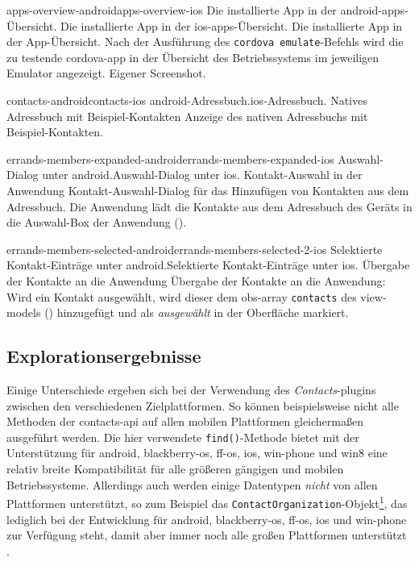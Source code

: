 	
	{apps-overview-android}{apps-overview-ios}
	{Die installierte App in der \gls{android}-\glspl{app}-Übersicht.}
	{Die installierte App in der \gls{ios}-\glspl{app}-Übersicht.}
	{Die installierte App in der App-Übersicht.}
	{Nach der Ausführung des \lstinline|cordova emulate|-Befehls wird die zu testende \gls{cordova}-\gls{app} in der Übersicht des Betriebssystems im jeweiligen Emulator angezeigt.}
	{Eigener Screenshot.}
	
	{contacts-android}{contacts-ios}
	{\gls{android}-Adressbuch.}{\gls{ios}-Adressbuch.}
	{Natives Adressbuch mit Beispiel-Kontakten}
	{Anzeige des nativen Adressbuchs mit Beispiel-Kontakten.}
	{\ownScreenshot}
	
	{errands-members-expanded-android}{errands-members-expanded-ios}
	{Auswahl-Dialog unter \gls{android}.}{Auswahl-Dialog unter \gls{ios}.}
	{Kontakt-Auswahl in der Anwendung}
	{Kontakt-Auswahl-Dialog für das Hinzufügen von Kontakten aus dem Adressbuch. Die Anwendung lädt die Kontakte aus dem Adressbuch des Geräts in die Auswahl-Box der Anwendung ().}
	{\ownScreenshot}
	
	{errands-members-selected-android}{errands-members-selected-2-ios}
	{Selektierte Kontakt-Einträge unter \gls{android}.}{Selektierte Kontakt-Einträge unter \gls{ios}.}
	{Übergabe der Kontakte an die Anwendung}
	{Übergabe der Kontakte an die Anwendung: Wird ein Kontakt ausgewählt, wird dieser dem \gls{obs}-\gls{array} \lstinline|contacts| des \glspl{view-model} () hinzugefügt und als \emph{ausgewählt} in der Oberfläche markiert.}
	{\ownScreenshot}
	
\subsection{Explorationsergebnisse}
Einige Unterschiede ergeben sich bei der Verwendung des \emph{Contacts}-\glspl{plugin} zwischen den verschiedenen Zielplattformen.
So können beispielsweise nicht alle Methoden der \gls{contacts-api} auf allen mobilen Plattformen gleichermaßen ausgeführt werden.
Die hier verwendete \lstinline|find()|-Methode bietet mit der Unterstützung für \gls{android}, \gls{blackberry-os}, \gls{ff-os}, \gls{ios}, \gls{win-phone} und \gls{win8} eine relativ  breite Kompatibilität für alle größeren gängigen und mobilen Betriebssysteme.
Allerdings auch werden einige Datentypen \emph{nicht} von allen Plattformen unterstützt, so zum Beispiel das \lstinline|ContactOrganization|-Objekt\footnote{.}, das lediglich bei der Entwicklung für \gls{android}, \gls{blackberry-os}, \gls{ff-os}, \gls{ios} und \gls{win-phone} zur Verfügung steht, damit aber immer noch alle großen Plattformen unterstützt \cite{Cordova_Plugin_Registry_Contacts}.

